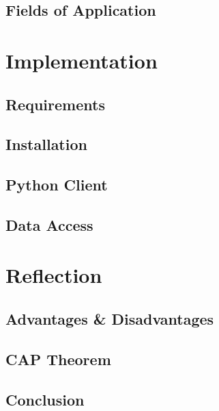 \subsection{Fields of Application} \label{subsec:fieldsOfApplicationHazelcast}


\section{Implementation} \label{sec:implementationHazelcast}
\subsection{Requirements} \label{subsec:requirementsHazelcast}
\subsection{Installation} \label{subsec:installationHazelcast}
\subsection{Python Client} \label{subsec:pythonClientHazelcast}
\subsection{Data Access} \label{subsec:dataAccessHazelcast}

\section{Reflection} \label{sec:reflectionHazelcast}
\subsection{Advantages \& Disadvantages} \label{subsec:advantagesDisadvantagesHazelcast}
\subsection{CAP Theorem} \label{subsec:capTheoremHazelcast}
\subsection{Conclusion} \label{subsec:conclusionHazelcast}

